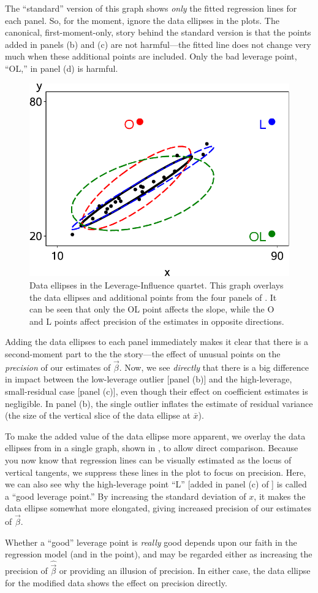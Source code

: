 The ``standard'' version of this graph shows \emph{only} the fitted regression lines for each
panel. So, for the moment, ignore the data ellipses in the plots.
The canonical, first-moment-only, story behind the standard version is that the points added in panels
(b) and (c) are not harmful---the fitted line does not change very much when these
additional points are included. Only the bad leverage point, ``OL,'' in panel (d) is harmful.

\begin{figure}[htb!]
  \centering
  \includegraphics[width=.5\textwidth,clip]{fig/levdemo22}
  \caption{Data ellipses in the Leverage-Influence quartet. This graph overlays the data ellipses
  and additional points from the four panels of . It can be seen that only the
  OL point affects the slope, while the O and L points affect precision of the estimates in opposite
  directions.}%
  \label{fig:levdemo22}
\end{figure}

Adding the data ellipses to each panel immediately makes it clear that there is a second-moment
part to the the story---the effect of unusual points on the \emph{precision} of our estimates
of $\vec{\beta}$.  Now,
we see \emph{directly} that there is a big difference in impact between
the low-leverage outlier [panel (b)] and the high-leverage, small-residual case [panel (c)],
even though their effect on coefficient estimates is negligible.
In panel (b), the single outlier inflates the estimate of residual variance (the size of the
vertical slice of the data ellipse at $\bar{x}$).

To make the added value of the data ellipse more apparent, we overlay the data ellipses from
 in a single graph, shown in
, to allow direct comparison.  Because you now know that regression lines
can be visually estimated as the locus of vertical tangents, we suppress these lines in the
plot to focus on precision.  Here, we can also see why the high-leverage
point ``L'' [added in panel (c) of ] is called a ``good leverage point.''
By increasing the standard deviation of $x$, it makes the data ellipse somewhat more elongated,
giving increased precision of our estimates of $\vec{\beta}$. 

Whether a ``good'' leverage point is \emph{really} good depends upon our faith in the regression model (and in the point), 
and may be regarded either as increasing the precision of $\hat{\vec{\beta}}$ or providing an illusion of precision.
In either case, the data ellipse for the modified data shows the effect on precision directly.

